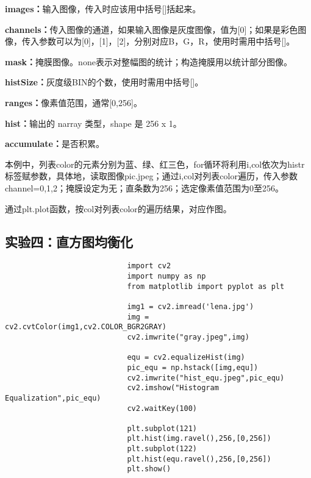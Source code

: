 \documentclass{article}
\begin{document}
\indent\textbf{images：}输入图像，传入时应该用中括号[]括起来。

\textbf{channels：}传入图像的通道，如果输入图像是灰度图像，值为[0]；如果是彩色图像，传入参数可以为[0]，[1]，[2]，分别对应B，G，R，使用时需用中括号[]。

\textbf{mask：}掩膜图像。none表示对整幅图的统计；构造掩膜用以统计部分图像。

\textbf{histSize：}灰度级BIN的个数，使用时需用中括号[]。

\textbf{ranges：}像素值范围，通常[0,256]。

\textbf{hist：}输出的 narray 类型，shape 是 256 x 1。

\textbf{accumulate：}是否积累。

本例中，列表color的元素分别为蓝、绿、红三色，for循环将利用i,col依次为histr标签赋参数，具体地，读取图像pic.jpeg；通过i,col对列表color遍历，传入参数channel=0,1,2；掩膜设定为无；直条数为256；选定像素值范围为0至256。

通过plt.plot函数，按col对列表color的遍历结果，对应作图。


\subsection{实验四：直方图均衡化}

\begin{lstlisting}
                            import cv2
                            import numpy as np
                            from matplotlib import pyplot as plt
                            
                            img1 = cv2.imread('lena.jpg')
                            img = cv2.cvtColor(img1,cv2.COLOR_BGR2GRAY)
                            cv2.imwrite("gray.jpeg",img)
                            
                            equ = cv2.equalizeHist(img)
                            pic_equ = np.hstack([img,equ])
                            cv2.imwrite("hist_equ.jpeg",pic_equ)
                            cv2.imshow("Histogram Equalization",pic_equ)
                            cv2.waitKey(100)
                            
                            plt.subplot(121)
                            plt.hist(img.ravel(),256,[0,256])
                            plt.subplot(122)
                            plt.hist(equ.ravel(),256,[0,256])
                            plt.show()

\end{lstlisting}
\end{document}

